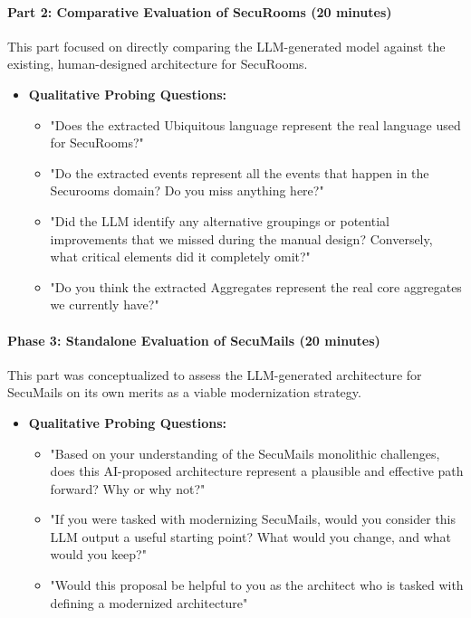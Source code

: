 \paragraph{Part 2: Comparative Evaluation of SecuRooms (20 minutes)}
This part focused on directly comparing the LLM-generated model against the existing, human-designed architecture for SecuRooms.

\begin{itemize}
    \item \textbf{Qualitative Probing Questions:}
    \begin{itemize}
        \item "Does the extracted Ubiquitous language represent the real language used for SecuRooms?"
        \item "Do the extracted events represent all the events that happen in the Securooms domain? Do you miss anything here?"
        \item "Did the LLM identify any alternative groupings or potential improvements that we missed during the manual design? Conversely, what critical elements did it completely omit?"
        \item "Do you think the extracted Aggregates represent the real core aggregates we currently have?"
    \end{itemize}
\end{itemize}

\paragraph{Phase 3: Standalone Evaluation of SecuMails (20 minutes)}
This part was conceptualized to assess the LLM-generated architecture for SecuMails on its own merits as a viable modernization strategy.

\begin{itemize}
    \item \textbf{Qualitative Probing Questions:}
    \begin{itemize}
        \item "Based on your understanding of the SecuMails monolithic challenges, does this AI-proposed architecture represent a plausible and effective path forward? Why or why not?"
        \item "If you were tasked with modernizing SecuMails, would you consider this LLM output a useful starting point? What would you change, and what would you keep?"
        \item "Would this proposal be helpful to you as the architect who is tasked with defining a modernized architecture"
    \end{itemize}
\end{itemize}

